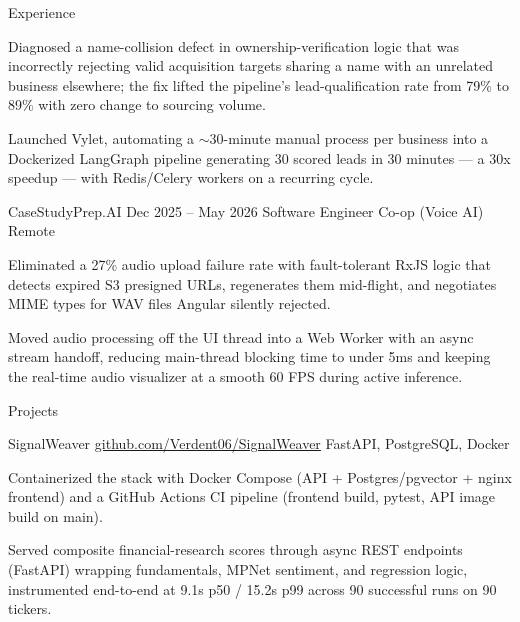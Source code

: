 \documentclass[
	11pt
]{../../../template}
\begin{document}
\begin{rSection}{E}{xperience}
\begin{rSectionEntry}
			\item Diagnosed a name-collision defect in ownership-verification logic that was incorrectly rejecting valid acquisition targets sharing a name with an unrelated business elsewhere; the fix lifted the pipeline's lead-qualification rate from 79\% to 89\% with zero change to sourcing volume.
			\item Launched Vylet, automating a $\sim$30-minute manual process per business into a Dockerized LangGraph pipeline generating 30 scored leads in 30 minutes --- a 30x speedup --- with Redis/Celery workers on a recurring cycle.
		\end{rSectionEntry}

		\begin{rSectionEntry}
			{CaseStudyPrep.AI}
			{Dec 2025 -- May 2026}
			{Software Engineer Co-op (Voice AI)}
			{}
			{Remote}

			\item Eliminated a 27\% audio upload failure rate with fault-tolerant RxJS logic that detects expired S3 presigned URLs, regenerates them mid-flight, and negotiates MIME types for WAV files Angular silently rejected.
			\item Moved audio processing off the UI thread into a Web Worker with an async stream handoff, reducing main-thread blocking time to under 5ms and keeping the real-time audio visualizer at a smooth 60 FPS during active inference.
		\end{rSectionEntry}
	\end{rSection}

	\begin{rSection}{P}{rojects}
		\begin{rSectionEntry}
			{SignalWeaver}
			{\href{https://github.com/Verdent06/SignalWeaver}{github.com/Verdent06/SignalWeaver}}
			{}
			{FastAPI, PostgreSQL, Docker}
			{}

			\item Containerized the stack with Docker Compose (API + Postgres/pgvector + nginx frontend) and a GitHub Actions CI pipeline (frontend build, pytest, API image build on main).
			\item Served composite financial-research scores through async REST endpoints (FastAPI) wrapping fundamentals, MPNet sentiment, and regression logic, instrumented end-to-end at 9.1s p50 / 15.2s p99 across 90 successful runs on 90 tickers.
		\end{rSectionEntry}
	\end{rSection}
\end{document}
